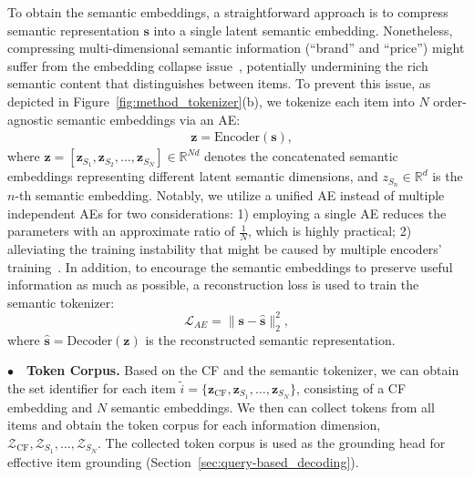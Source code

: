 To obtain the semantic embeddings, a straightforward approach is to compress semantic representation $\bm{s}$ into a single latent semantic embedding. 
Nonetheless, compressing multi-dimensional semantic information (\eg ``brand'' and ``price'') might suffer from the embedding collapse issue~\cite{guoembedding,pan2024ads}, potentially undermining the rich semantic content that distinguishes between items. 
To prevent this issue, as depicted in Figure~\ref{fig:method_tokenizer}(b), we tokenize each item into $N$ order-agnostic semantic embeddings via an AE: 
\begin{equation}
\begin{aligned}
&\bm{z} = \text{Encoder}(\bm{s}), 
\end{aligned}
\end{equation}
where 
$\bm{z}=[\bm{z}_{S_{1}}, \bm{z}_{S_{2}},\dots,\bm{z}_{S_{N}}]\in\mathbb{R}^{Nd}$ denotes the concatenated semantic embeddings representing different latent semantic dimensions, and ${z}_{S_{n}}\in\mathbb{R}^{d}$ is the $n$-th semantic embedding. 
Notably, we utilize a unified AE instead of multiple independent AEs for two considerations: 
1) employing a single AE reduces the parameters with an approximate ratio of $\frac{1}{N}$, which is highly practical; 
2) alleviating the training instability that might be caused by multiple encoders' training~\cite{tang2023improving}. 
In addition, to encourage the semantic embeddings to preserve useful information as much as possible, 
a reconstruction loss is used to train the semantic tokenizer: 
\begin{equation}
    \mathcal{L}_{AE} = \|\bm{s}-\hat{\bm{s}}\|_2^{2}, 
\end{equation}
where 
$\hat{\bm{s}} = \text{Decoder}(\bm{z})$ is the reconstructed semantic representation. 

\noindent$\bullet\quad$\textbf{Token Corpus.} 
Based on the CF and the semantic tokenizer, we can obtain the set identifier for each item
$\tilde{i} = \{\bm{z}_{\text{CF}},\bm{z}_{S_{1}},\dots,\bm{z}_{S_{N}}\}$, consisting of a CF embedding and $N$ semantic embeddings. 
We then can collect tokens from all items and obtain the token corpus for each information dimension, \ie $\mathcal{Z}_\text{CF}, \mathcal{Z}_{S_1}, \dots, \mathcal{Z}_{S_N}$. 
The collected token corpus is used as the grounding head for effective item grounding (\cf Section~\ref{sec:query-based_decoding}). 

